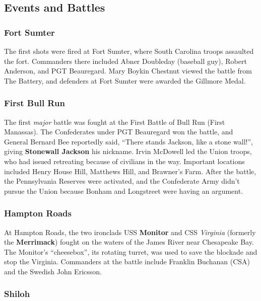 
\subsection*{Events and Battles}

\subsubsection*{Fort Sumter}

The first shots were fired at Fort Sumter, where South Carolina troops assaulted the fort.
Commanders there included Abner Doubleday (baseball guy), Robert Anderson, and PGT Beauregard.
Mary Boykin Chestnut viewed the battle from The Battery,
and defenders at Fort Sumter were awarded the Gillmore Medal.

\subsubsection*{First Bull Run}

The first \textit{major} battle was fought at the First Battle of Bull Run (First Manassas).
The Confederates under PGT Beauregard won the battle,
and General Bernard Bee reportedly said, ``There stands Jackson, like a stone wall!'',
giving \textbf{Stonewall Jackson} his nickname.
Irvin McDowell led the Union troops, who had issued retreating because of civilians in the way.
Important locations included Henry House Hill, Matthews Hill, and Brawner's Farm.
After the battle, the Pennsylvania Reserves were activated,
and the Confederate Army didn't pursue the Union because Bonham and Longstreet were having an argument.

\subsubsection*{Hampton Roads}

At Hampton Roads, the two ironclads USS \textbf{Monitor} and CSS \textit{Virginia} (formerly the \textbf{Merrimack})
fought on the waters of the James River near Chesapeake Bay.
The Monitor's ``cheesebox'', its rotating turret, was used to save the blockade and stop the Virginia.
Commanders at the battle include Franklin Buchanan (CSA) and the Swedish John Ericsson.

\subsubsection*{Shiloh}

